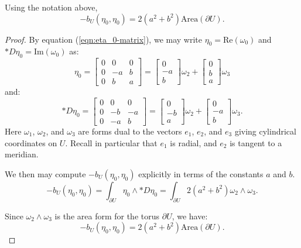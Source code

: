\begin{lemma}
  Using the notation above,
  $$-b_U(\eta_0, \eta_0) = 2(a^2+b^2)\mbox{Area}(\partial U).$$
  \label{lemma:b_U=area}
\end{lemma}

\begin{proof}
  By equation (\ref{eqn:eta_0-matrix}), we may write $\eta_0 =
  \mbox{Re}(\omega_0)$ and $*D\eta_0 = \mbox{Im}(\omega_0)$ as:
\begin{equation}
  \eta_0 = \left[\begin{array}{ccc}
      0&0&0\\
      0&-a&b\\
      0&b&a\end{array}\right] =
  \left[\begin{array}{c}0\\-a\\b\end{array}\right] \omega_2 +
  \left[\begin{array}{c}0\\b\\a\end{array}\right] \omega_3
\label{eqn:eta0mat}
\end{equation}
and:
$$
  *D\eta_0 = \left[\begin{array}{ccc}
      0&0&0\\
      0&-b&-a\\
      0&-a&b\end{array}\right] =
  \left[\begin{array}{c}0\\-b\\a\end{array}\right] \omega_2 +
  \left[\begin{array}{c}0\\-a\\b\end{array}\right] \omega_3.
$$
Here $\omega_1$, $\omega_2$, and $\omega_3$ are forms dual to the
vectors $e_1$, $e_2$, and $e_3$ giving cylindrical coordinates on
$U$.  Recall in particular that $e_1$ is radial, and $e_2$ is
tangent to a meridian.

We then may compute $-b_U(\eta_0, \eta_0)$ explicitly in terms of the
constants $a$ and $b$.
$$-b_U(\eta_0, \eta_0) = \int_{\partial U} \eta_0\wedge *D\eta_0 =
\int_{\partial U} 2(a^2+b^2)\omega_2\wedge\omega_3.$$

Since $\omega_2\wedge\omega_3$ is the area form for the torus
$\partial U$, we have:
$$-b_U(\eta_0, \eta_0) = 2 (a^2+b^2)\mbox{Area}(\partial U).$$
\end{proof}


